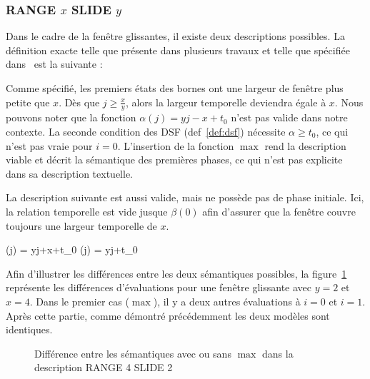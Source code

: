 \subsubsection{RANGE $x$ SLIDE $y$}
Dans le cadre de la fenêtre glissantes, il existe deux descriptions possibles. La définition exacte telle que présente dans plusieurs travaux et telle que spécifiée dans~\cite{Jain:spread} est la suivante :


Comme spécifié, les premiers états des bornes ont une largeur de fenêtre plus petite que $x$. Dès que $j \geq \frac xy$, alors la largeur temporelle deviendra égale à $x$. Nous pouvons noter que la fonction $\alpha(j) = yj-x+t_0$ n'est pas valide dans notre contexte. La seconde condition des DSF (def~\ref{def:dsf}) nécessite $\alpha \geq t_0$, ce qui n'est pas vraie pour $i=0$. L'insertion de la fonction $\max$ rend la description viable et décrit la sémantique des premières phases, ce qui n'est pas explicite dans sa description textuelle.

La description suivante est aussi valide, mais ne possède pas de phase initiale. Ici, la relation temporelle est vide jusque $\beta(0)$ afin d'assurer que la fenêtre couvre toujours une largeur temporelle de $x$.

	{\beta(j) = yj+x+t_0}
	{\alpha(j) = yj+t_0}

Afin d'illustrer les différences entre les deux sémantiques possibles, la figure~\ref{fig:valid:expressivite:slidemax} représente les différences d'évaluations pour une fenêtre glissante avec $y=2$ et $x=4$. Dans le premier cas ($\max$), il y a deux autres évaluations à $i=0$ et $i=1$. Après cette partie, comme démontré précédemment les deux modèles sont identiques.

\begin{figure}[ht]
\centering
\def\lgrad#1{\draw [thick] (#1,0) -- (#1,-0.2); \node [below] at (#1,-0.2){#1};}
\def\seg#1#2#3#4#5{\draw [thick] (#1#40.1,#3+0.25) -- (#1,#3+0.25) -- (#1,#3-0.25) -- (#1#40.1,#3-0.25); \draw [thick] (#1,#3) -- (#2,#3); \draw [thick] (#2#50.1,#3+0.25) -- (#2,#3+0.25) -- (#2,#3-0.25) -- (#2#50.1,#3-0.25);}
\def\seglbl#1#2#3#4#5#6{\seg{#1}{#2}{#3}{#4}{#5}\node [above] at (0.5*#1+0.5*#2,#3){#6};}
\caption{Différence entre les sémantiques avec ou sans $\max$ dans la description RANGE 4 SLIDE 2}\label{fig:valid:expressivite:slidemax}
\end{figure}

